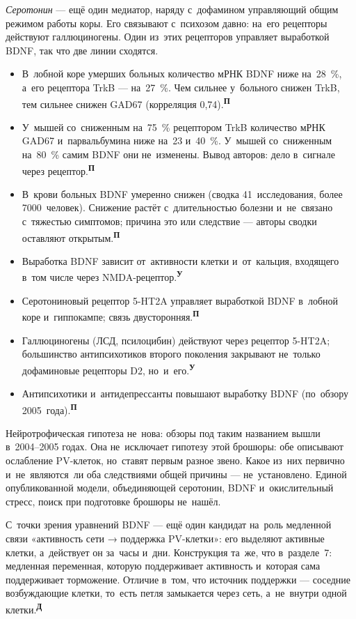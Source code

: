 \documentclass[11pt,a4paper,landscape,twocolumn]{article}
\newcommand{\tU}{\textsuperscript{\sffamily\bfseries\color{cM}У}}
\newcommand{\tP}{\textsuperscript{\sffamily\bfseries\color{cA}П}}
\newcommand{\tD}{\textsuperscript{\sffamily\bfseries\color{cO}Д}}
\newcommand{\facts}{\par\vspace{3pt}{\sffamily\bfseries\small\color{cM}Опорные факты}\par\vspace{-2pt}}
\begin{document}
\emph{Серотонин} — ещё один медиатор, наряду с~дофамином управляющий общим режимом работы коры. Его связывают с~психозом давно: на~его рецепторы действуют галлюциногены. Один из~этих рецепторов управляет выработкой BDNF, так что две линии сходятся.
\facts
\begin{itemize}
\item В~лобной коре умерших больных количество мРНК BDNF ниже на~28~\%, а~его рецептора TrkB — на~27~\%. Чем сильнее у~больного снижен TrkB, тем сильнее снижен GAD67 (корреляция 0,74).\tP
\item У~мышей со~сниженным на~75~\% рецептором TrkB количество мРНК GAD67 и~парвальбумина ниже на~23 и~40~\%. У~мышей со~сниженным на~80~\% самим BDNF они не~изменены. Вывод авторов: дело в~сигнале через рецептор.\tP
\item В~крови больных BDNF умеренно снижен (сводка 41~исследования, более 7000~человек). Снижение растёт с~длительностью болезни и~не~связано с~тяжестью симптомов; причина это или следствие — авторы сводки оставляют открытым.\tP
\item Выработка BDNF зависит от~активности клетки и~от~кальция, входящего в~том числе через NMDA-рецептор.\tU
\item Серотониновый рецептор 5-HT2A управляет выработкой BDNF в~лобной коре и~гиппокампе; связь двусторонняя.\tP
\item Галлюциногены (ЛСД, псилоцибин) действуют через рецептор 5-HT2A; большинство антипсихотиков второго поколения закрывают не~только дофаминовые рецепторы D2, но~и~его.\tU
\item Антипсихотики и~антидепрессанты повышают выработку BDNF (по~обзору 2005~года).\tP
\end{itemize}
\begin{note}
Нейротрофическая гипотеза не~нова: обзоры под таким названием вышли в~2004–2005 годах. Она не~исключает гипотезу этой брошюры: обе описывают ослабление PV-клеток, но~ставят первым разное звено. Какое из~них первично и~не~являются~ли оба следствиями общей причины — не~установлено. Единой опубликованной модели, объединяющей серотонин, BDNF и~окислительный стресс, поиск при подготовке брошюры не~нашёл.
\end{note}
\begin{ineq}
С~точки зрения уравнений BDNF — ещё один кандидат на~роль медленной связи «активность сети → поддержка PV-клетки»: его выделяют активные клетки, а~действует он за~часы и~дни. Конструкция та~же, что в~разделе~7: медленная переменная, которую поддерживает активность и~которая сама поддерживает торможение. Отличие в~том, что источник поддержки — соседние возбуждающие клетки, то~есть петля замыкается через сеть, а~не~внутри одной клетки.\tD
\end{ineq}
\end{document}
